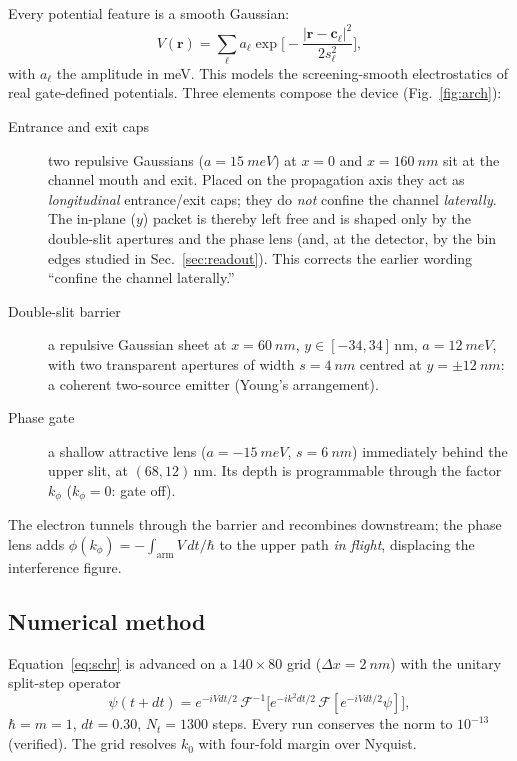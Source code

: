 \documentclass[11pt,a4paper]{article}
\newcommand{\kphi}{k_\phi}
\begin{document}
Every potential feature is a smooth Gaussian:
\begin{equation}
V(\bm r) = \sum_\ell a_\ell \exp\!\Big[-\frac{|\bm r-\bm c_\ell|^2}{2s_\ell^2}\Big],
\label{eq:lens}
\end{equation}
with $a_\ell$ the amplitude in meV. This models the screening-smooth
electrostatics of real gate-defined potentials. Three elements compose the
device (Fig.~\ref{fig:arch}):
\begin{description}
\item[Entrance and exit caps] two repulsive Gaussians ($a = \SI{15}{meV}$)
at $x=0$ and $x=\SI{160}{nm}$ sit at the channel mouth and exit. Placed on the
propagation axis they act as \emph{longitudinal} entrance/exit caps; they do
\emph{not} confine the channel \emph{laterally}. The in-plane ($y$) packet is
thereby left free and is shaped only by the double-slit apertures and the
phase lens (and, at the detector, by the bin edges studied in
Sec.~\ref{sec:readout}). This corrects the earlier wording ``confine the
channel laterally.''
\item[Double-slit barrier] a repulsive Gaussian sheet at $x=\SI{60}{nm}$,
$y\in[-34,34]$\,nm, $a=\SI{12}{meV}$, with two transparent apertures of width
$s=\SI{4}{nm}$ centred at $y=\pm\SI{12}{nm}$: a coherent two-source emitter
(Young's arrangement).
\item[Phase gate] a shallow attractive lens ($a=-\SI{15}{meV}$, $s=\SI{6}{nm}$)
immediately behind the upper slit, at $(68,12)$\,nm. Its depth is
programmable through the factor $\kphi$ ($\kphi=0$: gate off).
\end{description}
The electron tunnels through the barrier and recombines downstream; the phase
lens adds $\phi(\kphi) = -\!\int_{\text{arm}} V\,dt/\hbar$ to the upper path
\emph{in flight}, displacing the interference figure.

\subsection{Numerical method}
\label{sec:solver}

Equation~\eqref{eq:schr} is advanced on a $140\times80$ grid ($\Delta x =
\SI{2}{nm}$) with the unitary split-step operator
\begin{equation}
\psi(t{+}dt) = e^{-iVdt/2}\,\mathcal F^{-1}\!\big[e^{-ik^2 dt/2}\,
\mathcal F[e^{-iVdt/2}\psi]\big],
\label{eq:split}
\end{equation}
$\hbar=m=1$, $dt=0.30$, $N_t=1300$ steps. Every run conserves the norm to
$10^{-13}$ (verified). The grid resolves $k_0$ with four-fold margin over
Nyquist.
\end{document}
